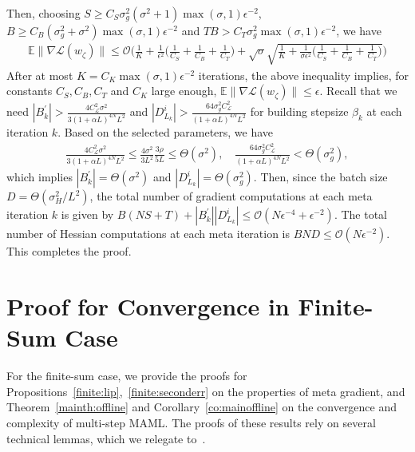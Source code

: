 \documentclass{osudissert96}
\begin{document}
	\hspace{-0.15cm}Then, choosing  $S\geq C_S\sigma_g^2(\sigma^2+1)\max(\sigma,1)\epsilon^{-2}$, $B\geq C_B(\sigma_g^2+\sigma^2)\max(\sigma,1)\epsilon^{-2}$ and $TB >C_{T}\sigma_g^2\max(\sigma,1) \epsilon^{-2}$, we have 
	\begin{align*}
	\mathbb{E}\|\nabla \mathcal{L}(w_\zeta) \|  \leq  \mathcal{O}\bigg(\frac{1}{K} + \frac{1}{\epsilon^2} \Big(\frac{1}{C_S} +\frac{1}{C_B}+\frac{1}{C_{T}} \Big)+ \sqrt{\sigma} \sqrt{\frac{1}{K}+\frac{1}{\sigma\epsilon^2}\Big(\frac{1}{C_S} +\frac{1}{C_B}+\frac{1}{C_{T}} \Big)}\bigg)
	\end{align*}
	After at most $K =  C_K\max(\sigma,1)\epsilon^{-2}$ iterations, the above inequality implies, for constants $C_S, C_B,C_T$ and $C_K$ large enough, 
	$\mathbb{E}\|\nabla \mathcal{L}(w_\zeta)\| \leq \epsilon$.
	Recall that we need $|B_k^\prime| > \frac{4C^2_{\mathcal{L}}\sigma^2}{3(1+\alpha L)^{4N}L^2}$ and $|D_{L_k}^i| > \frac{64\sigma^2_g C_\mathcal{L}^2}{(1+\alpha L)^{4N}L^2}$ for building stepsize $\beta_k$ at each iteration $k$. Based on the selected parameters, we have 
	\begin{align*}
	\frac{4C^2_{\mathcal{L}}\sigma^2}{3(1+\alpha L)^{4N}L^2} \leq \frac{4\sigma^2}{3L^2} \frac{3\rho}{5L}\leq \Theta({\sigma^2}), \quad \frac{64\sigma^2_g C_\mathcal{L}^2}{(1+\alpha L)^{4N}L^2} < \Theta(\sigma_g^2),
	\end{align*}
	which implies  $|B_k^\prime| =\Theta(\sigma^2)$ and $|D_{L_k}^i| =\Theta(\sigma^2_g)$. Then, since  the batch size $D =\Theta(\sigma_H^2/L^2)$, the total number of gradient computations at each meta iteration $k$ is given by 
	$B (NS+T) + |B_k^\prime||D_{L_k}^i|\leq \mathcal{O}(N\epsilon^{-4}+\epsilon^{-2}    )$.
	The total number of Hessian computations at each meta iteration is  
	$BND \leq \mathcal{O}(N\epsilon^{-2}). $
	This completes the proof. 

\section{Proof for Convergence in Finite-Sum Case}

For the finite-sum case, we provide the proofs for Propositions~\ref{finite:lip},~\ref{finite:seconderr} on the properties of meta gradient, and Theorem~\ref{mainth:offline} and  Corollary~\ref{co:mainoffline} on the convergence and complexity of multi-step MAML. The proofs of these results rely on several technical lemmas, which we relegate to~.  
\end{document}
